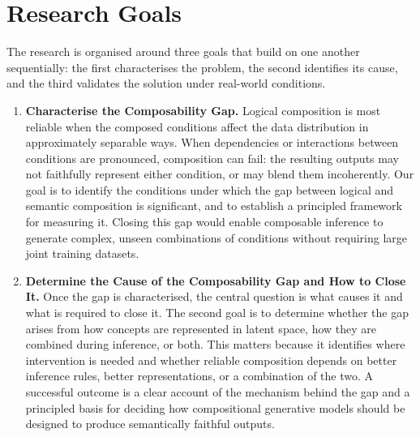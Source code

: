 \section{Research Goals}
\label{sec:research_objectives_research_goal}

The research is organised around three goals that build on one another sequentially:
the first characterises the problem, the second identifies its cause, and the third
validates the solution under real-world conditions.

\begin{enumerate}

    \item \textbf{Characterise the Composability Gap.}
    Logical composition is most reliable when the composed conditions affect the data distribution in approximately separable ways.
    When dependencies or interactions between conditions are pronounced, composition can fail: the resulting outputs may not faithfully represent either condition, or may blend them incoherently.
    Our goal is to identify the
    conditions under which the gap between logical and semantic composition is
    significant, and to establish a principled framework for measuring it.
    Closing this gap would enable composable inference to generate complex, unseen
    combinations of conditions without requiring large joint training datasets.

    \item \textbf{Determine the Cause of the Composability Gap and How to Close It.}
    Once the gap is characterised, the central question is what causes it and what is
    required to close it.
    The second goal is to determine whether the gap arises from how concepts are
    represented in latent space, how they are combined during inference, or both.
    This matters because it identifies where intervention is needed and whether
    reliable composition depends on better inference rules, better representations,
    or a combination of the two.
    A successful outcome is a clear account of the mechanism behind the gap and a
    principled basis for deciding how compositional generative models should be
    designed to produce semantically faithful outputs.


\end{enumerate}
